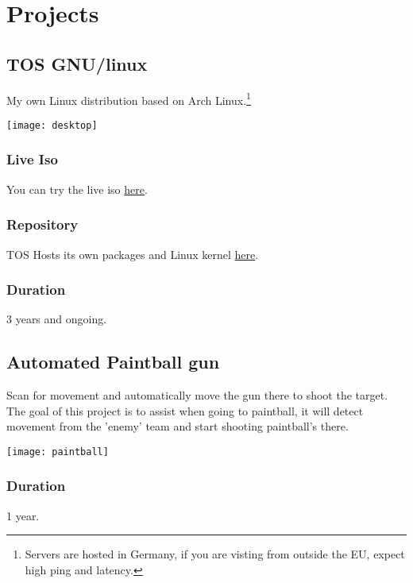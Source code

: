 \section{Proje\textcolor{mycolor}{cts}}
  \subsection{TOS GNU/linux}
    My own Linux distribution based on Arch Linux.\footnote{Servers are hosted in Germany, if you are visting from outside the EU, expect high ping and latency.}

    \begin{center}
      \texttt{[image: desktop]}
    \end{center}

    \subsubsection{Live Iso}
      You can try the live iso \href{https://tos.odex.be}{here}.\footnotemark[\value{footnote}]
    \subsubsection{Repository}
      TOS Hosts its own packages and Linux kernel \href{https://repo.odex.be/list.html}{here}.\footnotemark[\value{footnote}]
    \subsubsection{Duration}
      3 years and ongoing.

\pagebreak

  \subsection{Automated Paintball gun}
    Scan for movement and automatically move the gun there to shoot the target.
    The goal of this project is to assist when going to paintball,
    it will detect movement from the 'enemy' team and start shooting paintball's there.
    \begin{center}
      \texttt{[image: paintball]}
    \end{center}
    \subsubsection{Duration}
      1 year.

